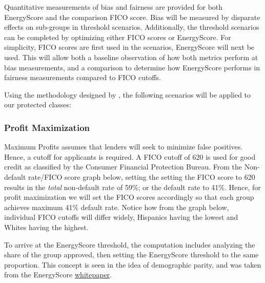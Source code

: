 \documentclass[11pt,]{article}
\begin{document}
Quantitative measurements of bias and fairness are provided for both
EnergyScore and the comparison FICO score. Bias will be measured by
disparate effects on sub-groups in threshold scenarios. Additionally,
the threshold scenarios can be completed by optimizing either FICO
scores or EnergyScore. For simplicity, FICO scores are first used in the
scenarios, EnergyScore will next be used. This will allow both a
baseline observation of how both metrics perform at bias measurements,
and a comparison to determine how EnergyScore performs in fairness
measurements compared to FICO cutoffs.

Using the methodology designed by \citet{DBLP:journals/corr/HardtPS16},
the following scenarios will be applied to our protected classes:

\hypertarget{profit-maximization}{%
\subsubsection{Profit Maximization}\label{profit-maximization}}

Maximum Profits assumes that lenders will seek to minimize false
positives. Hence, a cutoff for applicants is required. A FICO cutoff of
620 is used for good credit as classified by the Consumer Financial
Protection Bureau. From the Non-default rate/FICO score graph below,
setting the setting the FICO score to 620 results in the \emph{total}
non-default rate of 59\%; or the default rate to 41\%. Hence, for profit
maximization we will set the FICO scores accordingly so that each group
achieves maximum 41\% default rate. Notice how from the graph below,
individual FICO cutoffs will differ widely, Hispanics having the lowest
and Whites having the highest.

To arrive at the EnergyScore threshold, the computation includes
analyzing the share of the group approved, then setting the EnergyScore
threshold to the same proportion. This concept is seen in the idea of
demographic parity, and was taken from the EnergyScore
\href{https://solstice.us/wp-content/uploads/EnergyScore-White-Paper-1.pdf}{whitepaper}.
\end{document}
